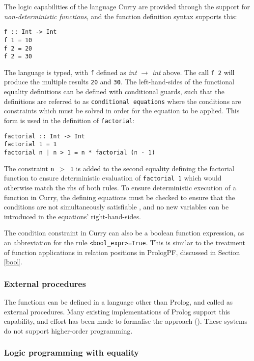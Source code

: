 The logic capabilities of the language Curry \cite{HAK+97} are provided
through the support for \textit{non-deterministic functions}, and the
function definition syntax supports this:
\begin{verbatim}
f :: Int -> Int
f 1 = 10
f 2 = 20
f 2 = 30
\end{verbatim}
The language is typed, with \texttt{f} defined as
\textit{int $\rightarrow$ int} above.  The call \texttt{f 2} will
produce the multiple results \texttt{20} and \texttt{30}.
The left-hand-sides of the functional equality definitions can be
defined with conditional guards, such that the definitions are
referred to as \texttt{conditional equations} where the conditions are
constraints which must be solved in order for the equation to be applied.
This form is used in the definition of \texttt{factorial}:
\begin{verbatim}
factorial :: Int -> Int
factorial 1 = 1
factorial n | n > 1 = n * factorial (n - 1)
\end{verbatim}
The constraint \texttt{n $>$ 1} is added to the second equality defining
the factorial function to ensure deterministic evaluation of 
\texttt{factorial 1} which would otherwise match the rhs of both rules.
To ensure deterministic execution of a function in Curry, the defining
equations
must be checked to ensure that the conditions are not simultaneously
satisfiable \cite{MNRA92}, and no new variables can be introduced
in the equations' right-hand-sides.

The condition constraint in Curry can also be a boolean function
expression, as an abbreviation for the rule \texttt{<bool\_{}expr>=True}.
This is similar to the treatment of function applications
in relation positions in PrologPF, discussed in Section \ref{bool}.

\subsubsection{External procedures}

The functions can be defined in a language other than Prolog, and
called as external procedures.  Many existing implementations of Prolog
support this capability, and effort has been made to formalise the
approach (\cite{BM88, MBB+93, Bon92}).  These systems do not support 
higher-order programming.

\subsubsection{Logic programming with equality}

